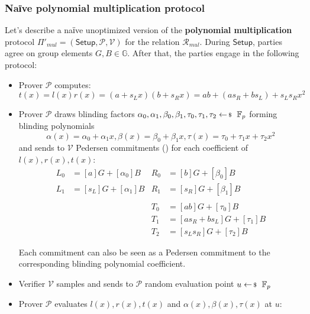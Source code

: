 \documentclass[../lecture-notes-148x210.tex]{subfiles}
\begin{document}
\subsubsection{Naїve polynomial multiplication protocol}
Let's describe a naїve unoptimized version of the \textbf{polynomial multiplication} protocol $\Pi'_{mul} = (\mathsf{Setup},\mathcal{P,V})$ for the relation $\mathcal{R}_{mul}$.
During $\mathsf{Setup}$, parties agree on group elements $G,B \in \mathbb{G}$. After that, the parties engage in the following protocol:
\begin{itemize}
    \item Prover $\mathcal{P}$ computes:
        $$t(x) = l(x)r(x) = (a+s_L x)(b+s_R x) = ab + (as_R + bs_L) + s_L s_R x^2$$
    \item Prover $\mathcal{P}$ draws blinding factors $\alpha_0, \alpha_1, \beta_0, \beta_1, \tau_0, \tau_1, \tau_2 \leftarrowS \mathbb{F}_p$ forming blinding polynomials 
    $$\alpha(x) = \alpha_0 + \alpha_1 x, \beta(x) = \beta_0 + \beta_1 x, \tau(x) = \tau_0 + \tau_1 x + \tau_2 x^2$$
    and sends to $\mathcal{V}$ Pedersen commitments () for each coefficient of $l(x), r(x), t(x)$:
        \begin{equation}
            \begin{aligned}
                L_0 &= [a]G + [\alpha_0]B & R_0 &= [b]G + [\beta_0]B\\
                L_1 &= [s_L]G + [\alpha_1]B &  R_1 &= [s_R]G + [\beta_1]B\\
                &&&\\ %
                && T_0 &= [ab]G + [\tau_0]B \\
                && T_1 &= [as_R + bs_L]G + [\tau_1]B \\
                && T_2 &= [s_L s_R]G + [\tau_2]B
            \end{aligned}
        \end{equation}
        \begin{remark}
            Each commitment can also be seen as a Pedersen commitment to the corresponding blinding polynomial coefficient.
        \end{remark}
    \item Verifier $\mathcal{V}$ samples and sends to $\mathcal{P}$ random evaluation point $u \leftarrowS \mathbb{F}_p$
    \item Prover $\mathcal{P}$ evaluates $l(x),r(x),t(x)$ and $\alpha(x), \beta(x), \tau(x)$ at $u$:
        \begin{equation}

\end{equation}
\end{itemize}
\end{document}
